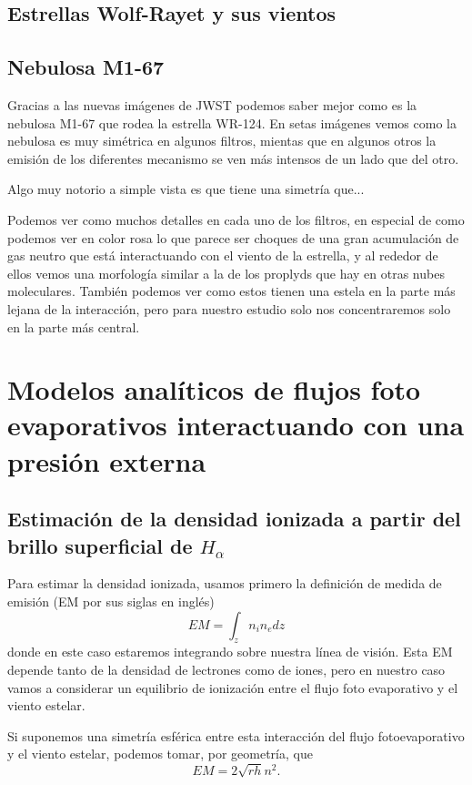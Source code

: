 \documentclass{book}
\begin{document}
\section{Estrellas Wolf-Rayet y sus vientos}

\section{Nebulosa M1-67}

Gracias a las nuevas imágenes de JWST podemos saber mejor como es la nebulosa M1-67 que rodea la estrella WR-124. En setas imágenes vemos como la nebulosa es muy simétrica en algunos filtros, mientas que en algunos otros la emisión de los diferentes mecanismo se ven más intensos de un lado que del otro.

Algo muy notorio a simple vista es que tiene una simetría que...


Podemos ver como muchos detalles en cada uno de los filtros, en especial de como podemos ver en color rosa lo que parece ser choques de una gran acumulación de gas neutro que está interactuando con el viento de la estrella, y al rededor de ellos vemos una morfología similar a la de los proplyds que hay en otras nubes moleculares. También podemos ver como estos tienen una estela en la parte más lejana de la interacción, pero para nuestro estudio solo nos concentraremos solo en la parte más central.

\chapter{Modelos analíticos de flujos foto evaporativos interactuando con una presión externa}

\section{Estimación de la densidad ionizada a partir del brillo superficial de $H_\alpha$}

Para estimar la densidad ionizada, usamos primero la definición de medida de emisión (EM por sus siglas en inglés)
\[EM=\int_z n_in_edz\] donde en este caso estaremos integrando sobre nuestra línea de visión. Esta EM depende tanto de la densidad de lectrones como de iones, pero en nuestro caso vamos a considerar un equilibrio de ionización entre el flujo foto evaporativo y el viento estelar.

Si suponemos una simetría esférica entre esta interacción del flujo fotoevaporativo y el viento estelar, podemos tomar, por geometría, que
\[EM=2\sqrt{rh}n^2.\]
\end{document}
